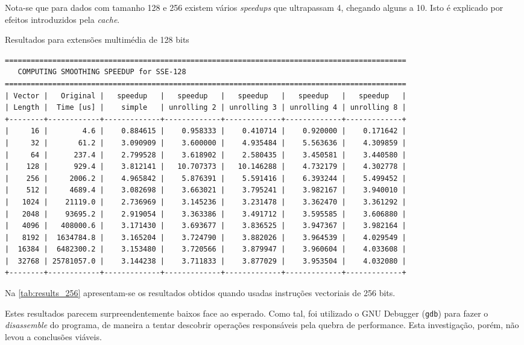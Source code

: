 \documentclass[a4paper]{article}
\begin{document}
	Nota-se que para dados com tamanho 128 e 256 existem vários \textit{speedups} que ultrapassam 4, chegando alguns a 10. Isto é explicado por efeitos introduzidos pela \textit{cache}.
	

	\begin{table}[H]
	\caption{Resultados para extensões multimédia de 128 bits}
	\label{tab:results_128}
	\begin{Verbatim}[fontsize=\small,xleftmargin=-3mm]
=============================================================================================
   COMPUTING SMOOTHING SPEEDUP for SSE-128
=============================================================================================
| Vector |   Original |   speedup   |   speedup   |   speedup   |   speedup   |   speedup   |
| Length |  Time [us] |    simple   | unrolling 2 | unrolling 3 | unrolling 4 | unrolling 8 |
+--------+------------+-------------+-------------+-------------+-------------+-------------+
|     16 |        4.6 |    0.884615 |    0.958333 |    0.410714 |    0.920000 |    0.171642 |
|     32 |       61.2 |    3.090909 |    3.600000 |    4.935484 |    5.563636 |    4.309859 |
|     64 |      237.4 |    2.799528 |    3.618902 |    2.580435 |    3.450581 |    3.440580 |
|    128 |      929.4 |    3.812141 |   10.707373 |   10.146288 |    4.732179 |    4.302778 |
|    256 |     2006.2 |    4.965842 |    5.876391 |    5.591416 |    6.393244 |    5.499452 |
|    512 |     4689.4 |    3.082698 |    3.663021 |    3.795241 |    3.982167 |    3.940010 |
|   1024 |    21119.0 |    2.736969 |    3.145236 |    3.231478 |    3.362470 |    3.361292 |
|   2048 |    93695.2 |    2.919054 |    3.363386 |    3.491712 |    3.595585 |    3.606880 |
|   4096 |   408000.6 |    3.171430 |    3.693677 |    3.836525 |    3.947367 |    3.982164 |
|   8192 |  1634784.8 |    3.165204 |    3.724790 |    3.882026 |    3.964539 |    4.029549 |
|  16384 |  6482300.2 |    3.153480 |    3.720566 |    3.879947 |    3.960604 |    4.033608 |
|  32768 | 25781057.0 |    3.144238 |    3.711833 |    3.877029 |    3.953504 |    4.032080 |
+--------+------------+-------------+-------------+-------------+-------------+-------------+
	\end{Verbatim}
	\end{table}


	Na \autoref{tab:results_256} apresentam-se os resultados obtidos quando usadas instruções vectoriais de 256 bits. 

        Estes resultados parecem surpreendentemente baixos face ao esperado. Como tal, foi utilizado o GNU Debugger (\texttt{gdb}) para fazer o \textit{disassemble} do programa, de maneira a tentar descobrir operações responsáveis pela quebra de performance. Esta investigação, porém, não levou a conclusões viáveis.
	
\end{document}
